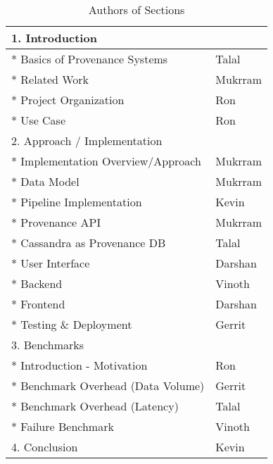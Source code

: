 \begin{table}
\begin{center}
 \begin{tabular}{| m{18em} m{10em} |} 
 \hline
1. Introduction                                                   &                    \\
 \hline
* Basics of Provenance Systems                                    &     Talal               \\
 \hline
* Related Work                                                    &          Mukrram          \\
 \hline
* Project Organization                                            &         Ron           \\
 \hline
* Use Case                                                        &   Ron                 \\
 \hline
2. Approach / Implementation                                      &                    \\
 \hline
* Implementation Overview/Approach                                &    Mukrram                \\
 \hline
* Data Model                                                      &        Mukrram            \\
 \hline
* Pipeline Implementation                                         &      Kevin              \\
 \hline
* Provenance API                                                     &         Mukrram           \\
 \hline
* Cassandra as Provenance DB                                      &       Talal             \\
 \hline
* User Interface                                                  &           Darshan         \\
 \hline
* Backend                                                         &         Vinoth           \\
 \hline
* Frontend                                                        &    Darshan                \\
 \hline
* Testing \& Deployment  &  Gerrit         \\
 \hline
3. Benchmarks                                                     &                    \\
 \hline
* Introduction - Motivation                                             & Ron \\
 \hline
* Benchmark Overhead (Data Volume)      & Gerrit \\  
 \hline
* Benchmark Overhead (Latency)      & Talal \\  
 \hline
* Failure Benchmark                                             &       Vinoth     \\
 \hline
4. Conclusion                                                     &     Kevin               \\
 \hline
\end{tabular}
\end{center}
\caption{Authors of Sections}
\label{table:authors}
\end{table}


